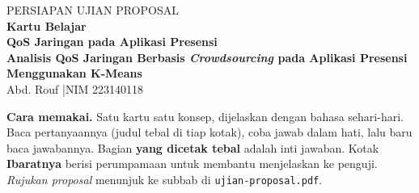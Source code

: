 \documentclass[11pt,a4paper]{article}
\begin{document}
\thispagestyle{plain}
\begin{center}
{\small\color{accent}\ttfamily PERSIAPAN UJIAN PROPOSAL}\\[6pt]
{\huge\bfseries\color{head} Kartu Belajar}\\[4pt]
{\Large\bfseries QoS Jaringan pada Aplikasi Presensi}\\[8pt]
{\bfseries Analisis QoS Jaringan Berbasis \textit{Crowdsourcing} pada Aplikasi Presensi Menggunakan K-Means}\\[6pt]
Abd. Rouf \quad|\quad NIM 223140118
\end{center}
\vspace{10pt}

\begin{tcolorbox}[enhanced, colback=accentsoft, frame hidden, arc=3pt, left=10pt, right=10pt]
\textbf{Cara memakai.} Satu kartu satu konsep, dijelaskan dengan bahasa sehari-hari.
Baca pertanyaannya (judul tebal di tiap kotak), coba jawab dalam hati, lalu baru baca jawabannya.
Bagian \textbf{yang dicetak tebal} adalah inti jawaban. Kotak \textcolor{warm}{\textbf{Ibaratnya}}
berisi perumpamaan untuk membantu menjelaskan ke penguji. \emph{Rujukan proposal} menunjuk ke
subbab di \texttt{ujian-proposal.pdf}.
\end{tcolorbox}

\vspace{6pt}
\tableofcontents

\end{document}
